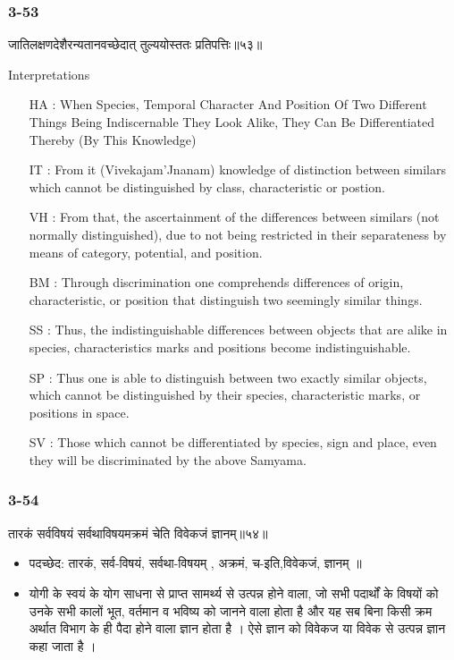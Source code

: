 \begin{frame}[fragile]\frametitle{3-53}
\begin{sanskrit}
जातिलक्षणदेशैरन्यतानवच्छेदात् तुल्ययोस्ततः प्रतिपत्तिः॥५३॥
\end{sanskrit}

Interpretations
\begin{itemize}	
\item [HA]: When Species, Temporal Character And Position Of Two Different Things Being Indiscernable They Look Alike, They Can Be Differentiated Thereby (By This Knowledge)
\item [IT]: From it (Vivekajam’Jnanam) knowledge of distinction between similars which cannot be distinguished by class, characteristic or postion.
\item [VH]: From that, the ascertainment of the differences between similars (not normally distinguished), due to not being restricted in their separateness by means of category, potential, and position.
\item [BM]: Through discrimination one comprehends differences of origin, characteristic, or position that distinguish two seemingly similar things.
\item [SS]: Thus, the indistinguishable differences between objects that are alike in species, characteristics marks and positions become indistinguishable.
\item [SP]: Thus one is able to distinguish between two exactly similar objects, which cannot be distinguished by their species, characteristic marks, or positions in space.
\item [SV]: Those which cannot be differentiated by species, sign and place, even they will be discriminated by the above Samyama. 
\end{itemize}
\end{frame}

\begin{frame}[fragile]\frametitle{3-54}
\begin{sanskrit}
तारकं सर्वविषयं सर्वथाविषयमक्रमं चेति विवेकजं ज्ञानम्॥५४॥
\end{sanskrit}

\begin{itemize}
\item पदच्छेद:  तारकं, सर्व-विषयं, सर्वथा-विषयम् , अक्रमं, च-इति,विवेकजं, ज्ञानम् ॥
\item योगी के स्वयं के योग साधना से प्राप्त सामर्थ्य से उत्पन्न होने वाला, जो सभी पदार्थों के विषयों को उनके सभी कालों भूत, वर्तमान व भविष्य को जानने वाला होता है और यह सब बिना किसी क्रम अर्थात विभाग के ही पैदा होने वाला ज्ञान होता है । ऐसे ज्ञान को विवेकज या विवेक से उत्पन्न ज्ञान कहा जाता है ।
\end{itemize}
\end{frame}

